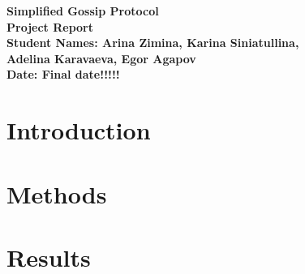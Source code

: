 \documentclass[a4paper,12pt]{article}
\begin{document}
\begin{titlepage}
    \centering
    {\Large \textbf{Simplified Gossip Protocol}}\\[1cm]
    \textbf{Project Report}\\[0.5cm]
    \vfill
    \textbf{Student Names: Arina Zimina, Karina Siniatullina,} \\[0.3cm]
    \textbf{Adelina Karavaeva, Egor Agapov} \\[0.5cm]
    \textbf{Date: Final date!!!!!} \\[2cm]
    \vfill
\end{titlepage}

\section{Introduction}

\section{Methods}

\section{Results}
\end{document}
